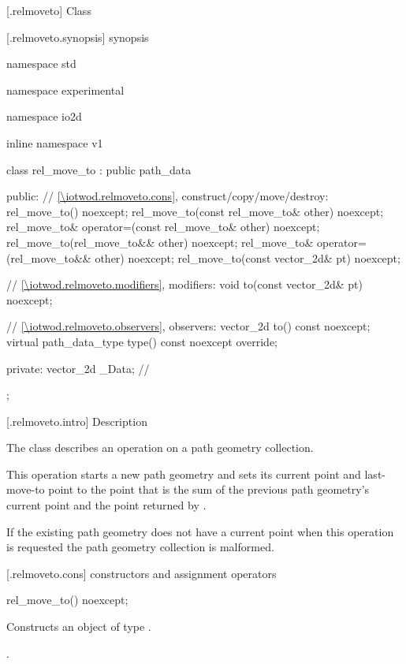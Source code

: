  [\iotwod.relmoveto] {Class }

 [\iotwod.relmoveto.synopsis] { synopsis}

\begin{codeblock}
namespace std { namespace experimental { namespace io2d { inline namespace v1 {
  class rel_move_to : public path_data {
  public:
    // \ref{\iotwod.relmoveto.cons}, construct/copy/move/destroy:
    rel_move_to() noexcept;
    rel_move_to(const rel_move_to& other) noexcept;
    rel_move_to& operator=(const rel_move_to& other) noexcept;
    rel_move_to(rel_move_to&& other) noexcept;
    rel_move_to& operator=(rel_move_to&& other) noexcept;
    rel_move_to(const vector_2d& pt) noexcept;

    // \ref{\iotwod.relmoveto.modifiers}, modifiers:
    void to(const vector_2d& pt) noexcept;

    // \ref{\iotwod.relmoveto.observers}, observers:
    vector_2d to() const noexcept;
    virtual path_data_type type() const noexcept override;
    
  private:
    vector_2d _Data; // \expos
  };
} } } }
\end{codeblock}

 [\iotwod.relmoveto.intro] { Description}

\pnum
{}
The class  describes an operation on a path geometry collection.

\pnum
This operation starts a new path geometry and sets its current point and last-move-to point to the point that is the sum of the previous path geometry's current point and the point returned by .

\pnum
If the existing path geometry does not have a current point when this operation is requested the path geometry collection is malformed.

 [\iotwod.relmoveto.cons] { constructors and assignment operators}

\begin{itemdecl}
    rel_move_to() noexcept;
\end{itemdecl}
\begin{itemdescr}
	\pnum
	\effects
	Constructs an object of type .
	
	\pnum
	\postconditions
	.
\end{itemdescr}

